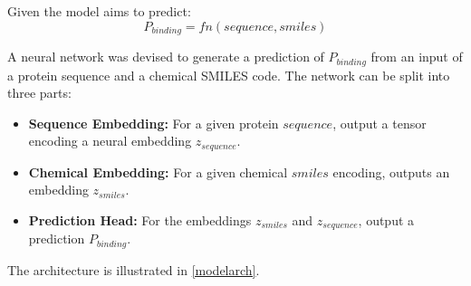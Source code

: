\documentclass[16pt]{book}
\begin{document}
Given the model aims to predict:
$$
P_{binding} = fn(sequence, smiles)
$$

A neural network was devised to generate a prediction of $P_{binding}$ from an input of a protein sequence and a chemical SMILES code.
The network can be split into three parts:

\begin{itemize}
	\item \textbf{Sequence Embedding:} For a given protein $sequence$, output a tensor encoding a neural embedding $z_{sequence}$.
	\item \textbf{Chemical Embedding:} For a given chemical $smiles$ encoding, outputs an embedding $z_{smiles}$.
	\item \textbf{Prediction Head:} For the embeddings $z_{smiles}$ and $z_{sequence}$, output a prediction $P_{binding}$.
\end{itemize}

The architecture is illustrated in \ref{modelarch}.
\end{document}
